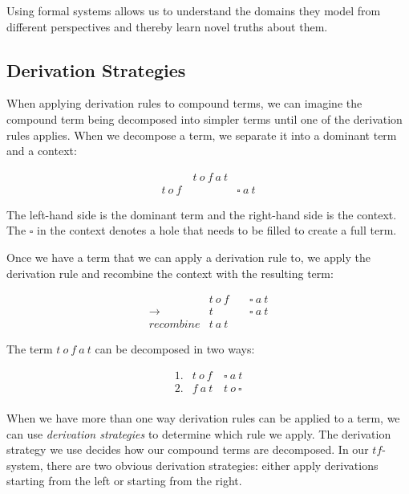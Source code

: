 Using formal systems allows us to understand the domains they model from
different perspectives and thereby learn novel truths about them.

\subsection{Derivation Strategies}

When applying derivation rules to compound terms, we can imagine the 
compound term being decomposed into simpler terms until one of the 
derivation rules applies. When we decompose a term, we separate it into a
dominant term and a context:

\[
\begin{array}{lcr}
  & t\ o\ f\ a\ t \\
  t\ o\ f\ && \square\ a\ t 
\end{array}
\]

The left-hand side is the dominant term and the right-hand side is the context. 
The $\square$ in the context denotes a hole that needs to be filled to create a full term.

Once we have a term that we can apply a derivation rule to, 
we apply the derivation rule and recombine the context with the resulting term:

\[
\begin{array}{rlcr}
      & t\ o\ f\ && \square\ a\ t  \\
  \to & t && \square\ a\ t  \\
  \textit{recombine} & t\ a\ t 
\end{array}
\]

The term $t\ o\ f\ a\ t$ can be decomposed in two ways:

\[
\begin{array}{rlr}
  1. & t\ o\ f\ & \square\ a\ t  \\
  2. & f\ a\ t & t\ o\ \square  \\
\end{array}
\]

When we have more than one way derivation rules can be applied to a term,
we can use \emph{derivation strategies} to determine which rule we apply.
The derivation strategy we use decides how our compound terms are decomposed.
In our $tf$-system, there are two obvious derivation strategies:
either apply derivations starting from the left or starting from the right.

